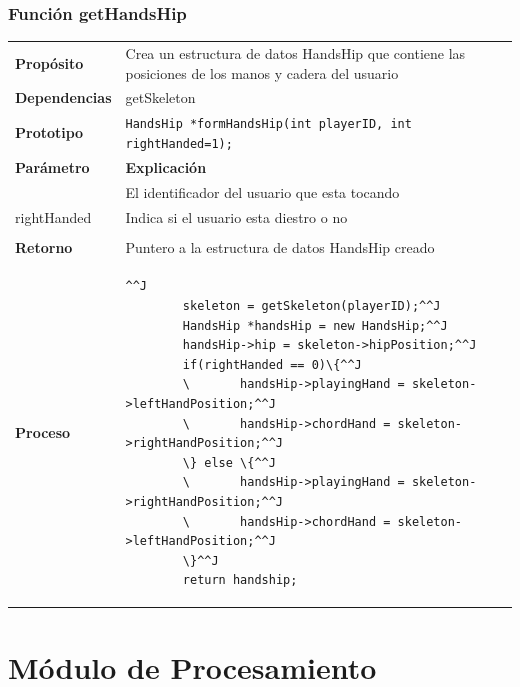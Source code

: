 \documentclass[a4paper,10pt]{article}
\begin{document}
\subsubsection{Función getHandsHip}
\begin{tabularx}{\textwidth}{p{25mm} X}
        \textbf{Propósito} & Crea un estructura de datos HandsHip que contiene
        las posiciones de los manos y cadera del usuario\\
        \textbf{Dependencias} & getSkeleton\\
        \textbf{Prototipo} & \lstinline{HandsHip *formHandsHip(int playerID, int rightHanded=1);}\\
        \textbf{Parámetro} & \textbf{Explicación} \\
        \begin{tabular}{p{2cm} l}
                playerID & El identificador del usuario que esta tocando \\
                rightHanded & Indica si el usuario esta diestro o no \\
        \end{tabular} \\

        \textbf{Retorno} & Puntero a la estructura de datos HandsHip creado\\
        \textbf{Proceso} & 
        \begin{lstlisting}^^J
        skeleton = getSkeleton(playerID);^^J
        HandsHip *handsHip = new HandsHip;^^J
        handsHip->hip = skeleton->hipPosition;^^J
        if(rightHanded == 0)\{^^J
        \       handsHip->playingHand = skeleton->leftHandPosition;^^J
        \       handsHip->chordHand = skeleton->rightHandPosition;^^J
        \} else \{^^J
        \       handsHip->playingHand = skeleton->rightHandPosition;^^J
        \       handsHip->chordHand = skeleton->leftHandPosition;^^J
        \}^^J
        return handship;
        \end{lstlisting} \\
\end{tabularx}

\section{Módulo de Procesamiento}
\label{sec:procesamiento}
\end{document}

